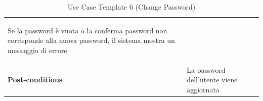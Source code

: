 \documentclass{article}
\begin{document}
\begin{table}
\begin{tabularx}{\textwidth}{|lX|}
\begin{description}[nosep,before=\leavevmode\vspace*{-1\baselineskip},after=\leavevmode\vspace*{-1\baselineskip}]
                                                                        \item [5a.] Se la password è vuota o la conferma password non corrisponde alla nuova password, il sistema mostra un messaggio di errore
                                                                    \end{description} \\
                    \rowcolor{white} \textbf{Post-conditions} & La password dell'utente viene aggiornata \\
                    \toprule
                \end{tabularx}
                \caption{Use Case Template 6 (Change Password)}
                \label{tab:use-case-template-6}
            \end{table}
\end{document}
